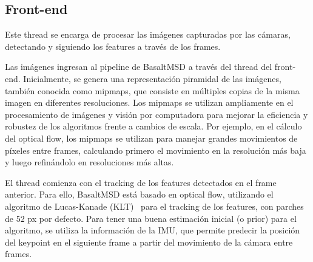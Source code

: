 \subsection{Front-end}

Este thread se encarga de procesar las imágenes capturadas por las cámaras, detectando y siguiendo los features a través de los frames.

Las imágenes ingresan al pipeline de BasaltMSD a través del thread del front-end. Inicialmente, se genera una representación piramidal de las imágenes, también conocida como mipmaps, que consiste en múltiples copias de la misma imagen en diferentes resoluciones. Los mipmaps se utilizan ampliamente en el procesamiento de imágenes y visión por computadora para mejorar la eficiencia y robustez de los algoritmos frente a cambios de escala. Por ejemplo, en el cálculo del optical flow, los mipmaps se utilizan para manejar grandes movimientos de píxeles entre frames, calculando primero el movimiento en la resolución más baja y luego refinándolo en resoluciones más altas.

El thread comienza con el tracking de los features detectados en el frame anterior. Para ello, BasaltMSD está basado en optical flow, utilizando el algoritmo de Lucas-Kanade (KLT)~\cite{lucas1981klt} para el tracking de los features, con parches de 52 px por defecto. Para tener una buena estimación inicial (o prior) para el algoritmo, se utiliza la información de la IMU, que permite predecir la posición del keypoint en el siguiente frame a partir del movimiento de la cámara entre frames.


